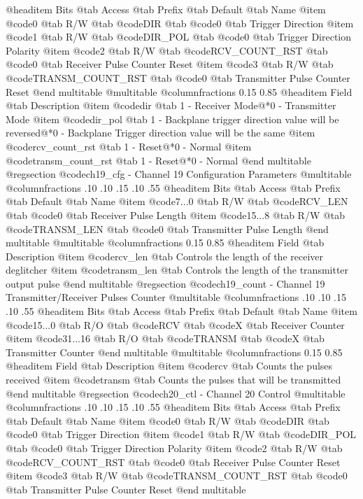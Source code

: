 @headitem Bits @tab Access @tab Prefix @tab Default @tab Name
@item @code{0}
@tab R/W @tab
@code{DIR}
@tab @code{0} @tab 
Trigger Direction
@item @code{1}
@tab R/W @tab
@code{DIR_POL}
@tab @code{0} @tab 
Trigger Direction Polarity
@item @code{2}
@tab R/W @tab
@code{RCV_COUNT_RST}
@tab @code{0} @tab 
Receiver Pulse Counter Reset
@item @code{3}
@tab R/W @tab
@code{TRANSM_COUNT_RST}
@tab @code{0} @tab 
Transmitter Pulse Counter Reset
@end multitable
@multitable @columnfractions 0.15 0.85
@headitem Field @tab Description
@item @code{dir} @tab 1 - Receiver Mode@*0 - Transmitter Mode
@item @code{dir_pol} @tab 1 - Backplane trigger direction value will be reversed@*0 - Backplane Trigger direction value will be the same
@item @code{rcv_count_rst} @tab 1 - Reset@*0 - Normal
@item @code{transm_count_rst} @tab 1 - Reset@*0 - Normal
@end multitable
@regsection @code{ch19_cfg} - Channel 19 Configuration Parameters
@multitable @columnfractions .10 .10 .15 .10 .55
@headitem Bits @tab Access @tab Prefix @tab Default @tab Name
@item @code{7...0}
@tab R/W @tab
@code{RCV_LEN}
@tab @code{0} @tab 
Receiver Pulse Length
@item @code{15...8}
@tab R/W @tab
@code{TRANSM_LEN}
@tab @code{0} @tab 
Transmitter Pulse Length
@end multitable
@multitable @columnfractions 0.15 0.85
@headitem Field @tab Description
@item @code{rcv_len} @tab Controls the length of the receiver deglitcher
@item @code{transm_len} @tab Controls the length of the transmitter output pulse
@end multitable
@regsection @code{ch19_count} - Channel 19 Transmitter/Receiver Pulses Counter
@multitable @columnfractions .10 .10 .15 .10 .55
@headitem Bits @tab Access @tab Prefix @tab Default @tab Name
@item @code{15...0}
@tab R/O @tab
@code{RCV}
@tab @code{X} @tab 
Receiver Counter
@item @code{31...16}
@tab R/O @tab
@code{TRANSM}
@tab @code{X} @tab 
Transmitter Counter
@end multitable
@multitable @columnfractions 0.15 0.85
@headitem Field @tab Description
@item @code{rcv} @tab Counts the pulses received
@item @code{transm} @tab Counts the pulses that will be transmitted
@end multitable
@regsection @code{ch20_ctl} - Channel 20 Control
@multitable @columnfractions .10 .10 .15 .10 .55
@headitem Bits @tab Access @tab Prefix @tab Default @tab Name
@item @code{0}
@tab R/W @tab
@code{DIR}
@tab @code{0} @tab 
Trigger Direction
@item @code{1}
@tab R/W @tab
@code{DIR_POL}
@tab @code{0} @tab 
Trigger Direction Polarity
@item @code{2}
@tab R/W @tab
@code{RCV_COUNT_RST}
@tab @code{0} @tab 
Receiver Pulse Counter Reset
@item @code{3}
@tab R/W @tab
@code{TRANSM_COUNT_RST}
@tab @code{0} @tab 
Transmitter Pulse Counter Reset
@end multitable
